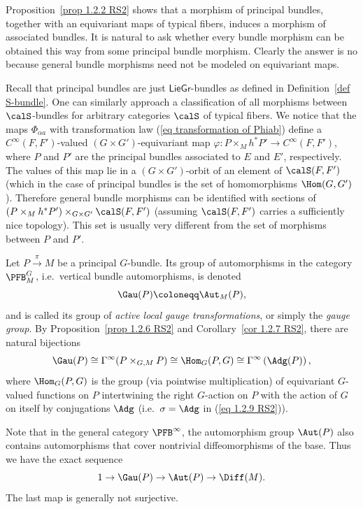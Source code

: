 \begin{rem}
    Proposition~\ref{prop 1.2.2 RS2} shows that a morphism of principal bundles, together with an equivariant maps of typical fibers, induces a morphism of associated bundles. It is natural to ask whether every bundle morphism can be obtained this way from some principal bundle morphism. Clearly the answer is no because general bundle morphisms need not be modeled on equivariant maps.
    
    Recall that principal bundles are just $\mathsf{LieGr}$-bundles as defined in Definition~\ref{def S-bundle}. One can similarly approach a classification of all morphisms between $\calS$-bundles for arbitrary categories $\calS$ of typical fibers. We notice that the maps $\Phi_{\alpha a}$ with transformation law (\ref{eq transformation of Phiab}) define a $C^\infty(F,F')$-valued $(G\times G')$-equivariant map $\varphi:P\times_M h^\ast P'\to C^\infty(F,F')$, where $P$ and $P'$ are the principal bundles associated to $E$ and $E'$, respectively. The values of this map lie in a $(G\times G')$-orbit of an element of $\calS(F,F')$ (which in the case of principal bundles is the set of homomorphisms $\Hom(G,G')$). Therefore general bundle morphisms can be identified with sections of $(P\times_M h^\ast P')\times_{G\times G'}\calS(F,F')$ (assuming $\calS(F,F')$ carries a sufficiently nice topology). This set is usually very different from the set of morphisms between $P$ and $P'$.
\end{rem}

\begin{defn}
    Let $P\overset{\pi}{\to}M$ be a principal $G$-bundle. Its group of automorphisms in the category $\PFB^G_M$, i.e.\ vertical bundle automorphisms, is denoted 
    \[\Gau(P)\coloneqq \Aut_M(P),\]
    and is called its group of \emph{active local gauge transformations}, or simply the \emph{gauge group}. By Proposition~\ref{prop 1.2.6 RS2} and Corollary~\ref{cor 1.2.7 RS2}, there are natural bijections \[\Gau(P)\cong \Gamma^\infty(P\times_{G,M}P)\cong \Hom_G(P,G)\cong \Gamma^\infty\left(\Adg(P)\right),\]
    where $\Hom_G(P,G)$ is the group (via pointwise multiplication) of equivariant $G$-valued functions on $P$ intertwining the right $G$-action on $P$ with the action of $G$ on itself by conjugations $\Adg$ (i.e.\ $\sigma=\Adg$ in (\ref{eq 1.2.9 RS2})).
\end{defn}

Note that in the general category $\PFB^\infty$, the automorphism group $\Aut(P)$ also contains automorphisms that cover nontrivial diffeomorphisms of the base. Thus we have the exact sequence
\[1\to \Gau(P)\to \Aut(P)\to \Diff(M).\]
The last map is generally not surjective. 

